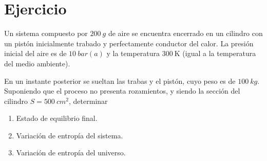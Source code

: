 \section{Ejercicio}\label{ej:Chap07Ejercicio17}
Un sistema compuesto por $\SI{200}{g}$ de aire se encuentra encerrado en un cilindro con un pistón inicialmente trabado y perfectamente conductor del calor. La presión inicial del aire es de $\SI{10}{bar(a)}$ y la temperatura $\SI{300}{\kelvin}$ (igual a la temperatura del medio ambiente).

En un instante posterior se sueltan las trabas y el pistón, cuyo peso es de $\SI{100}{kg}$. Suponiendo que el proceso no presenta rozamientos, y siendo la sección del cilindro $S=\SI{500}{cm^2}$, determinar
\begin{enumerate}
    \item Estado de equilibrio final.
    \item Variación de entropía del sistema.
    \item Variación de entropía del universo.
\end{enumerate}